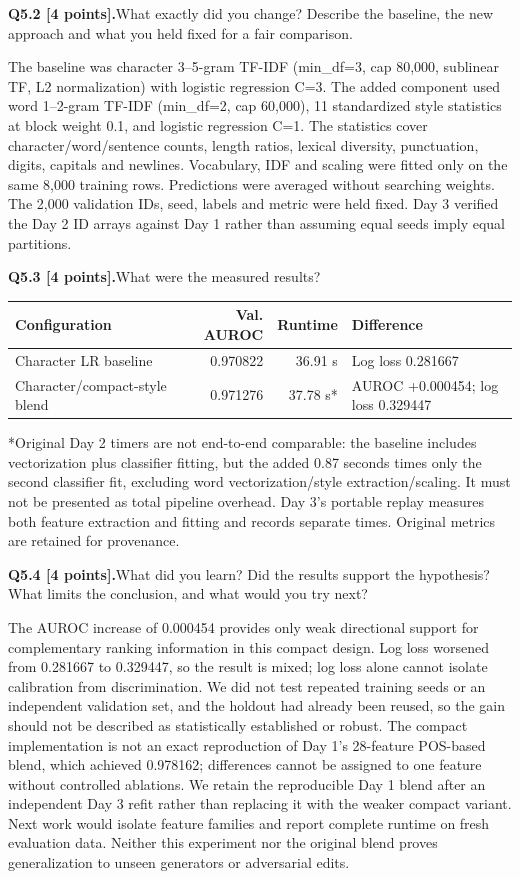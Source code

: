 \documentclass[11pt,letterpaper]{article}
\newcommand{\question}[2]{\needspace{4\baselineskip}\par\addvspace{0.45em}\noindent\textbf{#1}\quad #2\par\nobreak\vspace{0.1em}}
\begin{document}
\question{Q5.2 [4 points].}{What exactly did you change? Describe the baseline, the new approach and what you held fixed for a fair comparison.}

The baseline was character 3--5-gram TF-IDF (min\_df=3, cap 80,000, sublinear TF, L2 normalization) with logistic regression C=3. The added component used word 1--2-gram TF-IDF (min\_df=2, cap 60,000), 11 standardized style statistics at block weight 0.1, and logistic regression C=1. The statistics cover character/word/sentence counts, length ratios, lexical diversity, punctuation, digits, capitals and newlines. Vocabulary, IDF and scaling were fitted only on the same 8,000 training rows. Predictions were averaged without searching weights. The 2,000 validation IDs, seed, labels and metric were held fixed. Day 3 verified the Day 2 ID arrays against Day 1 rather than assuming equal seeds imply equal partitions.

\question{Q5.3 [4 points].}{What were the measured results?}

\begin{tabularx}{\linewidth}{@{}YrrY@{}}\toprule Configuration & Val. AUROC & Runtime & Difference \\ \midrule
Character LR baseline & 0.970822 & 36.91 s & Log loss 0.281667 \\
Character/compact-style blend & 0.971276 & 37.78 s* & AUROC +0.000454; log loss 0.329447 \\
\bottomrule\end{tabularx}
*Original Day 2 timers are not end-to-end comparable: the baseline includes vectorization plus classifier fitting, but the added 0.87 seconds times only the second classifier fit, excluding word vectorization/style extraction/scaling. It must not be presented as total pipeline overhead. Day 3's portable replay measures both feature extraction and fitting and records separate times. Original metrics are retained for provenance.

\question{Q5.4 [4 points].}{What did you learn? Did the results support the hypothesis? What limits the conclusion, and what would you try next?}

The AUROC increase of 0.000454 provides only weak directional support for complementary ranking information in this compact design. Log loss worsened from 0.281667 to 0.329447, so the result is mixed; log loss alone cannot isolate calibration from discrimination. We did not test repeated training seeds or an independent validation set, and the holdout had already been reused, so the gain should not be described as statistically established or robust. The compact implementation is not an exact reproduction of Day 1's 28-feature POS-based blend, which achieved 0.978162; differences cannot be assigned to one feature without controlled ablations. We retain the reproducible Day 1 blend after an independent Day 3 refit rather than replacing it with the weaker compact variant. Next work would isolate feature families and report complete runtime on fresh evaluation data. Neither this experiment nor the original blend proves generalization to unseen generators or adversarial edits.
\end{document}
